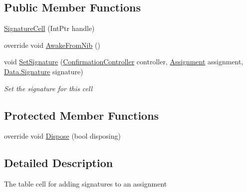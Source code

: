 \subsection*{Public Member Functions}
\begin{DoxyCompactItemize}
\item 
\hyperlink{class_field_service_1_1i_o_s_1_1_signature_cell_ad932b9c69d8823280ab69571b7e03ef0}{Signature\+Cell} (Int\+Ptr handle)
\item 
override void \hyperlink{class_field_service_1_1i_o_s_1_1_signature_cell_a74b0ecce4137a2b5fa8e8654e919ee99}{Awake\+From\+Nib} ()
\item 
void \hyperlink{class_field_service_1_1i_o_s_1_1_signature_cell_adc17ebea9be5da093e3b23a64bfd2d59}{Set\+Signature} (\hyperlink{class_field_service_1_1i_o_s_1_1_confirmation_controller}{Confirmation\+Controller} controller, \hyperlink{class_field_service_1_1_data_1_1_assignment}{Assignment} assignment, \hyperlink{class_field_service_1_1_data_1_1_signature}{Data.\+Signature} signature)
\begin{DoxyCompactList}\small\item\em Set the signature for this cell \end{DoxyCompactList}\end{DoxyCompactItemize}
\subsection*{Protected Member Functions}
\begin{DoxyCompactItemize}
\item 
override void \hyperlink{class_field_service_1_1i_o_s_1_1_signature_cell_a976e65b523330aa2c5bf015890593214}{Dispose} (bool disposing)
\end{DoxyCompactItemize}


\subsection{Detailed Description}
The table cell for adding signatures to an assignment 



